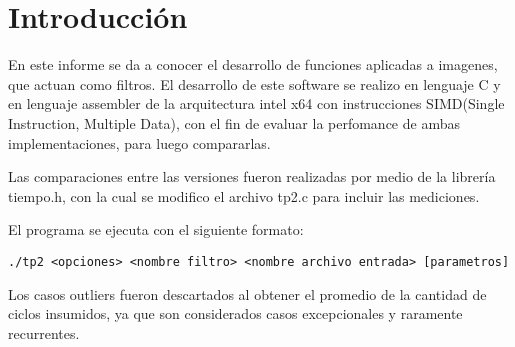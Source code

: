 \section{Introducci\'on}

En este informe se da a conocer el desarrollo de funciones aplicadas a imagenes, que actuan como filtros. El desarrollo de este software se realizo en lenguaje C y en lenguaje assembler de la arquitectura intel x64 con instrucciones SIMD(Single Instruction, Multiple Data), con el fin de evaluar la perfomance de ambas implementaciones, para luego compararlas.

Las comparaciones entre las versiones fueron realizadas por medio de la librer\'ia tiempo.h, con la cual se modifico el archivo tp2.c para incluir las mediciones.

El programa se ejecuta con el siguiente formato:

\begin{codesnippet}
\begin{verbatim}
./tp2 <opciones> <nombre filtro> <nombre archivo entrada> [parametros]
\end{verbatim}
\end{codesnippet}

Los casos outliers fueron descartados al obtener el promedio de la cantidad de ciclos insumidos, ya que son considerados casos excepcionales y raramente recurrentes.

